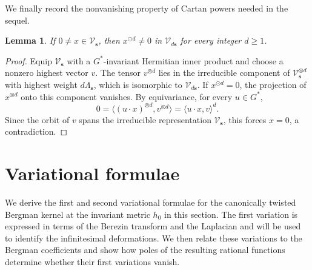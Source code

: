 \documentclass[11pt,reqno]{amsart}
\newtheorem{lemma}[theorem]{Lemma}
\theoremstyle{corollary}
\theoremstyle{conjecture}
\theoremstyle{assumption}
\theoremstyle{proposition}
\theoremstyle{remark}
\numberwithin{equation}{section}
\begin{document}
We finally record the nonvanishing property of Cartan powers needed in the sequel.
\begin{lemma}\label{lem:pre-cartan-nonvanishing}
If $0\neq x\in\mathcal V_{\mathbf s}$, then $x^{\odot d}\neq 0$ in $\mathcal V_{d\mathbf s}$ for every integer $d\geq1$.
\end{lemma}
\begin{proof}
Equip $\mathcal V_{\mathbf s}$ with a $G^*$-invariant Hermitian inner product and choose a nonzero highest vector $v$. The tensor $v^{\otimes d}$ lies in the irreducible component of $\mathcal V_{\mathbf s}^{\otimes d}$ with highest weight $d\Lambda_{\mathbf s}$, which is isomorphic to $\mathcal V_{d\mathbf s}$. If $x^{\odot d}=0$, the projection of $x^{\otimes d}$ onto this component vanishes. By equivariance, for every $u\in G^*$,
\[
0=\langle (u\cdot x)^{\otimes d},v^{\otimes d}\rangle=\langle u\cdot x,v\rangle^d.
\]
Since the orbit of $v$ spans the irreducible representation $\mathcal V_{\mathbf s}$, this forces $x=0$, a contradiction.
\end{proof}

\section{Variational formulae}\label{sec:variation}
We derive the first and second variational formulae for the canonically twisted Bergman kernel at the invariant metric $h_0$ in this section. The first variation is expressed in terms of the Berezin transform and the Laplacian and will be used to identify the infinitesimal deformations. We then relate these variations to the Bergman coefficients and show how poles of the resulting rational functions determine whether their first variations vanish.
\end{document}
